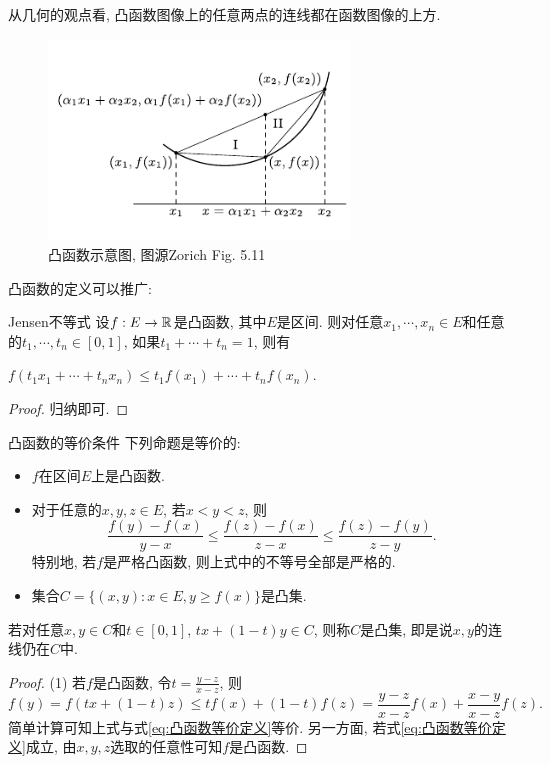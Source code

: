 从几何的观点看, 凸函数图像上的任意两点的连线都在函数图像的上方. 

\begin{figure}[H]
	\centering
	\includegraphics[width=8cm]{attachment/凸函数.pdf}
	\caption{凸函数示意图, 图源Zorich Fig. 5.11}
\end{figure}

凸函数的定义可以推广: 

\begin{theorem}{Jensen不等式}
	设$f:E \to \mathbb{R}$是凸函数, 其中$E$是区间. 则对任意$x_1,\cdots ,x_n \in E$和任意的$t_1,\cdots ,t_n \in [0,1]$, 如果$t_1+\cdots +t_n=1$, 则有
	\begin{center}
		$f(t_1x_1+\cdots +t_nx_n) \leq t_1f(x_1) + \cdots + t_nf(x_n). $
	\end{center}
\end{theorem}
\begin{proof}
	归纳即可. 
\end{proof}

\begin{proposition}{凸函数的等价条件}
	下列命题是等价的: 
	\begin{itemize}
		\item $f$在区间$E$上是凸函数. 
		\item 对于任意的$x,y,z \in E$, 若$x<y<z$, 则
		\begin{equation}
			\frac{f(y)-f(x)}{y-x} \leq \frac{f(z)-f(x)}{z-x} \leq \frac{f(z)-f(y)}{z-y}. \label{eq:凸函数等价定义}
		\end{equation}
		特别地, 若$f$是严格凸函数, 则上式中的不等号全部是严格的. 
		\item 集合$C=\{ (x,y):x\in E,y \geq f(x) \}$是凸集. 
	\end{itemize}
\end{proposition}
\begin{remark}
	若对任意$x,y \in C$和$t \in [0,1]$, $tx+(1-t)y \in C$, 则称$C$是凸集, 即是说$x,y$的连线仍在$C$中. 
\end{remark}
\begin{proof}
	(1) 若$f$是凸函数, 令$t=\frac{y-z}{x-z}$, 则$$f(y) = f(tx+(1-t)z) \leq tf(x)+(1-t)f(z) = \frac{y-z}{x-z}f(x) + \frac{x-y}{x-z}f(z).$$
	简单计算可知上式与式\ref{eq:凸函数等价定义}等价. 另一方面, 若式\ref{eq:凸函数等价定义}成立, 由$x,y,z$选取的任意性可知$f$是凸函数. 
\end{proof}

